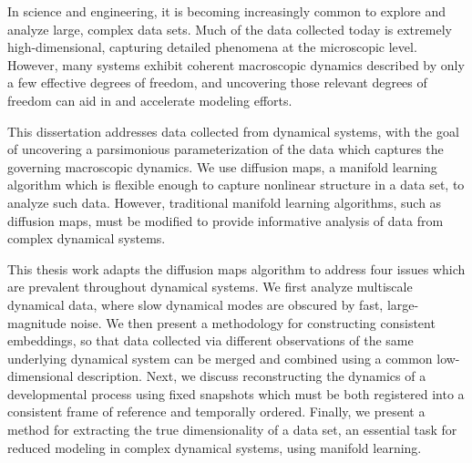 

In science and engineering, it is becoming increasingly common to explore and analyze large, complex data sets.
%
Much of the data collected today is extremely high-dimensional, capturing detailed phenomena at the microscopic level.
%
However, many systems exhibit coherent macroscopic dynamics described by only a few effective degrees of freedom, and uncovering those relevant degrees of freedom can aid in and accelerate modeling efforts.

This dissertation addresses data collected from dynamical systems, with the goal of uncovering a parsimonious parameterization of the data which captures the governing macroscopic dynamics.
%
We use diffusion maps, a manifold learning algorithm which is flexible enough to capture nonlinear structure in a data set, to analyze such data.
%
However, traditional manifold learning algorithms, such as diffusion maps, must be modified to provide informative analysis of data from complex dynamical systems.

This thesis work adapts the diffusion maps algorithm to address four issues which are prevalent throughout dynamical systems.
%
We first analyze multiscale dynamical data, where slow dynamical modes are obscured by fast, large-magnitude noise.
%
We then present a methodology for constructing consistent embeddings, so that data collected via different observations of the same underlying dynamical system can be merged and combined using a common low-dimensional description.
%
Next, we discuss reconstructing the dynamics of a developmental process using fixed snapshots which must be both registered into a consistent frame of reference and temporally ordered.
%
Finally, we present a method for extracting the true dimensionality of a data set, an essential task for reduced modeling in complex dynamical systems, using manifold learning. 